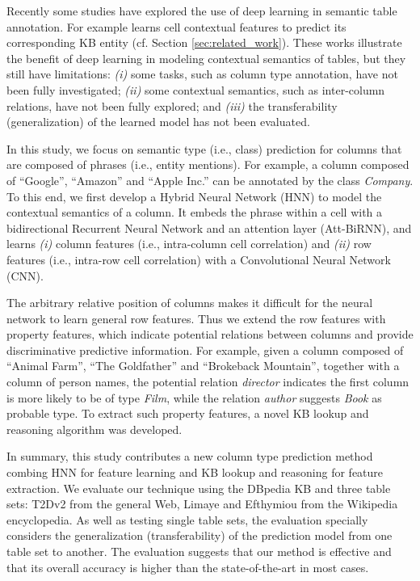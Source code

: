 \documentclass{article}
\begin{document}
Recently some studies have explored the use of deep learning in semantic table annotation.
For example
\cite{luo2018cross} learns 
cell contextual
features to predict its corresponding KB entity
(cf. Section \ref{sec:related_work}).
These works illustrate the benefit of deep learning in modeling contextual semantics of tables,
but they still have limitations:
\textit{(i)} some tasks, such as column type annotation, have not been fully investigated;
\textit{(ii)} some contextual semantics, such as inter-column relations, have not been fully explored; and 
\textit{(iii)} the transferability (generalization) of the learned model has not been evaluated.


In this study, we focus on semantic type (i.e., class) prediction for columns that are composed of phrases (i.e., entity mentions).
For example, a column composed of ``Google'', ``Amazon'' and ``Apple Inc.'' 
can be annotated by the class \textit{Company}.
To this end, we first develop a Hybrid Neural Network (HNN)
to model the contextual semantics of a column.
It embeds the phrase within a cell
with a bidirectional Recurrent Neural Network and an attention layer (Att-BiRNN),
and learns \textit{(i)} column features (i.e., intra-column cell correlation)
and \textit{(ii)} row features (i.e., intra-row cell correlation)
with a Convolutional Neural Network (CNN).


The arbitrary relative position of columns makes it difficult for the neural network to learn general row features.
Thus we extend the row features with property features, which indicate potential relations between columns and provide discriminative predictive information.
For example, given a column composed of ``Animal Farm'', ``The Goldfather'' and ``Brokeback Mountain'',
together with a column of person names, 
the potential relation \textit{director} indicates the first column is more likely to be of type \textit{Film}, 
while the relation \textit{author} suggests \textit{Book} as probable type. 
To extract such property features, a novel KB lookup and reasoning algorithm was developed.


In summary, this study contributes a new column type prediction method combing HNN for feature learning and KB lookup and reasoning for feature extraction.
We evaluate our technique using the DBpedia KB and three table sets:
T2Dv2 from the general Web, 
Limaye and Efthymiou from 
the Wikipedia encyclopedia.
As well as testing single table sets, 
the evaluation specially considers the generalization (transferability) of the prediction model from one table set to another.
The evaluation suggests that our method is effective and that its overall accuracy is higher than the state-of-the-art in most cases.
\end{document}
